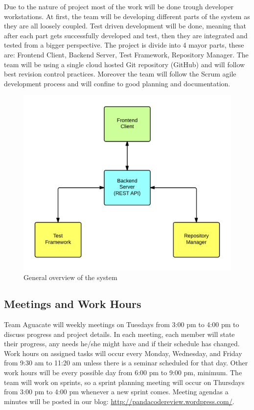 Due to the nature of project most of the work will be done trough developer workstations. At first, the team will be developing different parts of the system as they are all loosely coupled. Test driven development will be done, meaning that after each part gets successfully developed and test, then they are integrated and tested from a bigger perspective. The project is divide into 4 mayor parts, these are: Frontend Client, Backend Server, Test Framework, Repository Manager. The team will be using a single cloud hosted Git repository (GitHub) and will follow best revision control practices. Moreover the team will follow the Scrum agile development process and will confine to good planning and documentation.

\begin{figure}[H]
	\centering
	\includegraphics[width=\textwidth]{img/bigArquitectOverview}
	\caption{General overview of the system}
\end{figure}

\subsection{Meetings and Work Hours}
Team Aguacate will weekly meetings on Tuesdays from 3:00 pm to 4:00 pm to discuss progress and project details. In each meeting, each member will state their progress, any needs he/she might have and if their schedule has changed. Work hours on assigned tasks will occur every Monday, Wednesday, and Friday from 9:30 am to 11:20 am unless there is a seminar scheduled for that day. Other work hours will be every possible day from 6:00 pm to 9:00 pm, minimum. The team will work on sprints, so a sprint planning meeting will occur on Thursdays from 3:00 pm to 4:00 pm whenever a new sprint comes.  Meeting agendas a minutes will be posted in our blog: \url{http://pandacodereview.wordpress.com/}.

